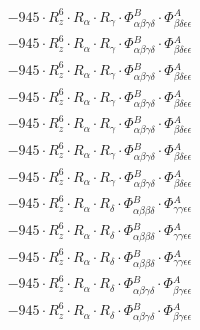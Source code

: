 \documentclass{article}
\begin{document}
\begin{subequations}
\begin{gather}
\begin{array}{c}
 \\[0.2em] 		 - 945 \cdot R_{z}^{6} \cdot R_{\alpha{}} \cdot R_{\gamma{}} \cdot \Phi{}^{B}_{\alpha{}\beta{}\gamma{}\delta{}} \cdot \Phi{}^{A}_{\beta{}\delta{}\epsilon{}\epsilon{}} 
 \\[0.2em] 		 - 945 \cdot R_{z}^{6} \cdot R_{\alpha{}} \cdot R_{\gamma{}} \cdot \Phi{}^{B}_{\alpha{}\beta{}\gamma{}\delta{}} \cdot \Phi{}^{A}_{\beta{}\delta{}\epsilon{}\epsilon{}} 
 \\[0.2em] 		 - 945 \cdot R_{z}^{6} \cdot R_{\alpha{}} \cdot R_{\gamma{}} \cdot \Phi{}^{B}_{\alpha{}\beta{}\gamma{}\delta{}} \cdot \Phi{}^{A}_{\beta{}\delta{}\epsilon{}\epsilon{}} 
 \\[0.2em] 		 - 945 \cdot R_{z}^{6} \cdot R_{\alpha{}} \cdot R_{\gamma{}} \cdot \Phi{}^{B}_{\alpha{}\beta{}\gamma{}\delta{}} \cdot \Phi{}^{A}_{\beta{}\delta{}\epsilon{}\epsilon{}} 
 \\[0.2em] 		 - 945 \cdot R_{z}^{6} \cdot R_{\alpha{}} \cdot R_{\gamma{}} \cdot \Phi{}^{B}_{\alpha{}\beta{}\gamma{}\delta{}} \cdot \Phi{}^{A}_{\beta{}\delta{}\epsilon{}\epsilon{}} 
 \\[0.2em] 		 - 945 \cdot R_{z}^{6} \cdot R_{\alpha{}} \cdot R_{\gamma{}} \cdot \Phi{}^{B}_{\alpha{}\beta{}\gamma{}\delta{}} \cdot \Phi{}^{A}_{\beta{}\delta{}\epsilon{}\epsilon{}} 
 \\[0.2em] 		 - 945 \cdot R_{z}^{6} \cdot R_{\alpha{}} \cdot R_{\gamma{}} \cdot \Phi{}^{B}_{\alpha{}\beta{}\gamma{}\delta{}} \cdot \Phi{}^{A}_{\beta{}\delta{}\epsilon{}\epsilon{}} 
 \\[0.2em] 		 - 945 \cdot R_{z}^{6} \cdot R_{\alpha{}} \cdot R_{\delta{}} \cdot \Phi{}^{B}_{\alpha{}\beta{}\beta{}\delta{}} \cdot \Phi{}^{A}_{\gamma{}\gamma{}\epsilon{}\epsilon{}} 
 \\[0.2em] 		 - 945 \cdot R_{z}^{6} \cdot R_{\alpha{}} \cdot R_{\delta{}} \cdot \Phi{}^{B}_{\alpha{}\beta{}\beta{}\delta{}} \cdot \Phi{}^{A}_{\gamma{}\gamma{}\epsilon{}\epsilon{}} 
 \\[0.2em] 		 - 945 \cdot R_{z}^{6} \cdot R_{\alpha{}} \cdot R_{\delta{}} \cdot \Phi{}^{B}_{\alpha{}\beta{}\beta{}\delta{}} \cdot \Phi{}^{A}_{\gamma{}\gamma{}\epsilon{}\epsilon{}} 
 \\[0.2em] 		 - 945 \cdot R_{z}^{6} \cdot R_{\alpha{}} \cdot R_{\delta{}} \cdot \Phi{}^{B}_{\alpha{}\beta{}\gamma{}\delta{}} \cdot \Phi{}^{A}_{\beta{}\gamma{}\epsilon{}\epsilon{}} 
 \\[0.2em] 		 - 945 \cdot R_{z}^{6} \cdot R_{\alpha{}} \cdot R_{\delta{}} \cdot \Phi{}^{B}_{\alpha{}\beta{}\gamma{}\delta{}} \cdot \Phi{}^{A}_{\beta{}\gamma{}\epsilon{}\epsilon{}} 

\end{array}
\end{gather}
\end{subequations}
\end{document}
